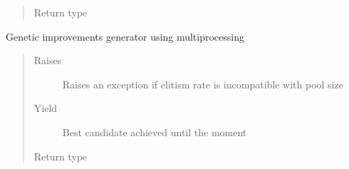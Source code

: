 \documentclass[letterpaper,10pt,english]{sphinxmanual}
\begin{document}
\begin{fulllineitems}
\begin{fulllineitems}
\begin{quote}
\begin{description}
\item[{Return type}] \leavevmode
\sphinxAtStartPar
{\hyperref[\detokenize{MolOpt.genetic:MolOpt.genetic.genetic.Chromosome}]{}}

\end{description}\end{quote}

\end{fulllineitems}


\begin{fulllineitems}
\label{\detokenize{MolOpt.genetic:MolOpt.genetic.genetic.Genetic.__get_improvement_mp}}
\sphinxAtStartPar
Genetic improvements generator using multiprocessing
\begin{quote}\begin{description}
\item[{Raises}] \leavevmode
\sphinxAtStartPar
{} \textendash{} Raises an exception if elitism rate is incompatible with pool size

\item[{Yield}] \leavevmode
\sphinxAtStartPar
Best candidate achieved until the moment

\item[{Return type}] \leavevmode
\sphinxAtStartPar
{\hyperref[\detokenize{MolOpt.genetic:MolOpt.genetic.genetic.Chromosome}]{}}

\end{description}\end{quote}

\end{fulllineitems}



\end{fulllineitems}
\end{document}
